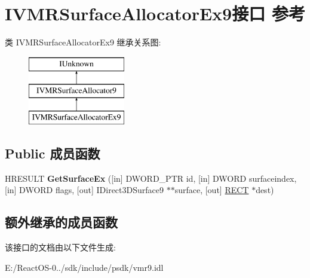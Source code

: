 \hypertarget{interface_i_v_m_r_surface_allocator_ex9}{}\section{I\+V\+M\+R\+Surface\+Allocator\+Ex9接口 参考}
\label{interface_i_v_m_r_surface_allocator_ex9}
类 I\+V\+M\+R\+Surface\+Allocator\+Ex9 继承关系图\+:\begin{figure}[H]
\begin{center}
\leavevmode
\includegraphics[height=3.000000cm]{interface_i_v_m_r_surface_allocator_ex9}
\end{center}
\end{figure}
\subsection*{Public 成员函数}
\begin{DoxyCompactItemize}
\item 
\mbox{\label{interface_i_v_m_r_surface_allocator_ex9_a2b45ffb59302fd7194ae21eb42be0258}} 
H\+R\+E\+S\+U\+LT {\bfseries Get\+Surface\+Ex} (\mbox{[}in\mbox{]} D\+W\+O\+R\+D\+\_\+\+P\+TR id, \mbox{[}in\mbox{]} D\+W\+O\+RD surfaceindex, \mbox{[}in\mbox{]} D\+W\+O\+RD flags, \mbox{[}out\mbox{]} I\+Direct3\+D\+Surface9 $\ast$$\ast$surface, \mbox{[}out\mbox{]} \hyperlink{structtag_r_e_c_t}{R\+E\+CT} $\ast$dest)
\end{DoxyCompactItemize}
\subsection*{额外继承的成员函数}


该接口的文档由以下文件生成\+:\begin{DoxyCompactItemize}
\item 
E\+:/\+React\+O\+S-\/0../sdk/include/psdk/vmr9.\+idl\end{DoxyCompactItemize}
